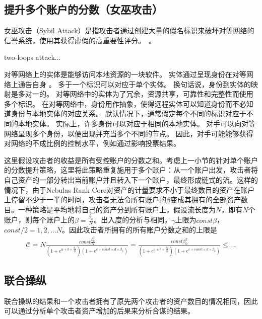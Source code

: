 \subsection{提升多个账户的分数（女巫攻击）}
女巫攻击（Sybil Attack）是指攻击者通过创建大量的假名标识来破坏对等网络的信誉系统，使用其获得虚假的高重要性评分。~\cite{quercia2010sybil}。

two-loops attack...


对等网络上的实体是能够访问本地资源的一块软件。 实体通过呈现身份在对等网络上通告自身 。 多于一个标识可以对应于单个实体。
换句话说，身份到实体的映射是多对一的。 对等网络中的实体为了冗余，资源共享，可靠性和完整性而使用多个标识。
在对等网络中，身份用作抽象，使得远程实体可以知道身份而不必知道身份与本地实体的对应关系。
默认情况下，通常假定每个不同的标识对应于不同的本地实体。 实际上，许多身份可以对应于相同的本地实体。
对手可以向对等网络呈现多个身份，以便出现并充当多个不同的节点。 因此，对手可能能够获得对网络的不成比例的控制水平，例如通过影响投票结果。


这里假设攻击者的收益是所有受控账户的分数之和。考虑上一小节的针对单个账户的分数提升策略，这里将此策略重复施用于多个账户：从一个账户出发，攻击者将自己资产的一部分转出当前账户并且转入下一个账户，最终形成链式的流。这样的情况下，由于Nebulas Rank Core对资产的计量要求不小于最终数目的资产在账户上停留不少于一半的时间，攻击者无法令所有账户的$\beta$变成其拥有的全部资产数目。一种策略是平均地将自己的资产分到所有账户上，假设流长度为$N$，即有$N$个账户，则每个账户上的$\beta = \frac{\beta_0}{N}$。出入度的分析与相同，$\gamma$上限为$const \beta$，$const/2 = 1, 2, \dots N$。因此攻击者所拥有的所有账户分数之和的上限是
\begin{align}
\mathcal{C} = N \frac{const \frac{\beta_0 ^2}{N}}{ (1+e^{a + b \times{} \frac{\beta_0}{N} }) (1+e^{c + const \times d \times{} \beta_0})} = \frac{const \beta_0 ^2 }{ (1+e^{a + b \times{} \frac{\beta_0}{N} }) (1+e^{c + const \times d \times{} \beta_0})} \leq ...
\end{align}


\subsection{联合操纵 \label{sec:coalition}}
联合操纵的结果和一个攻击者拥有了原先两个攻击者的资产数目的情况相同，因此可以通过分析单个攻击者资产增加的后果来分析合谋的结果。

